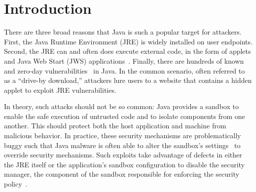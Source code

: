 \documentclass{sig-alternate-05-2015}
\begin{document}
\section{Introduction}

There are three broad reasons that Java is such a popular target for attackers.
First, the Java Runtime Environment (JRE) is widely installed on user endpoints.
Second, the JRE can and often does execute external code, in the form of
applets and Java Web Start (JWS) %
applications~\cite{gong1997going,gong2003inside}. Finally, there are hundreds
of known and zero-day vulnerabilities~\cite{xforceQ12013} %
in Java. In the
common scenario, often referred to as a ``drive-by download,'' attackers lure
users to a website that contains a hidden applet to exploit JRE vulnerabilities.


In theory, such attacks should not be so common:
Java provides a sandbox to enable the safe execution of untrusted code and to isolate
components from one another. This should protect both the host application and machine from
malicious behavior.
In practice, these security mechanisms are problematically
buggy such that Java malware is often able to alter the sandbox's
settings~\cite{garber_2012} to override security mechanisms. Such exploits take advantage of defects in either
the JRE itself or the application's sandbox configuration to
disable the security manager, the component of the sandbox responsible for enforcing the
security policy~\cite{fireeye_2013,svoboda_anatomy_blog_2013,security_explorations_2012,blackhat_2012}.
\end{document}
